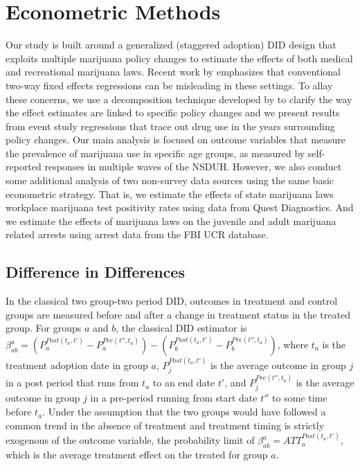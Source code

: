 \documentclass[12pt]{article}%
\begin{document}
\section{Econometric Methods} 
\label{sec:Methods}

Our study is built around a generalized (staggered adoption) DID design that exploits multiple marijuana policy changes to estimate the effects of both medical and recreational marijuana laws. Recent work by \cite{Goodman-Bacon2018} emphasizes that conventional two-way fixed effects regressions can be misleading in these settings. To allay these concerns, we use a decomposition technique developed by \cite{Goodman-Bacon2018} to clarify the way the effect estimates are linked to specific policy changes and we present results from event study regressions that trace out drug use in the years surrounding policy changes. Our main analysis is focused on outcome variables that measure the prevalence of marijuana use in specific age groups, as measured by self-reported responses in multiple waves of the NSDUH. However, we also conduct some additional analysis of two non-survey data sources using the same basic econometric strategy. That is, we estimate the effects of state marijuana laws workplace marijuana test positivity rates using data from Quest Diagnostics. And we estimate the effects of marijuana laws on the juvenile and adult marijuana related arrests using arrest data from the FBI UCR database.

\subsection{Difference in Differences}

In the classical two group-two period DID, outcomes in treatment and control groups are measured before and after a change in treatment status in the treated group. For groups $a$ and $b$, the classical DID estimator is $\beta_{ab}^a = (P_a^{Post(t_a,t')} - P_a^{Pre(t'',t_a )}) - (P_b^{Post(t_a,t')} - P_b^{Pre(t'',t_a )})$, where $t_a$ is the treatment adoption date in group $a$, $P_j^{Post(t_a,t')}$ is the average outcome in group $j$ in a post period that runs from $t_a$ to an end date $t'$, and $P_j^{Pre(t'',t_a)}$  is the average outcome in group $j$ in a pre-period running from start date $t''$ to some time before $t_a$. Under the assumption that the two groups would have followed a common trend in the absence of treatment and treatment timing is strictly exogenous of the outcome variable, the probability limit of  $\beta_{ab}^a = ATT_a^{Post(t_a,t' )}$, which is the average treatment effect on the treated for group $a$.
\end{document}
